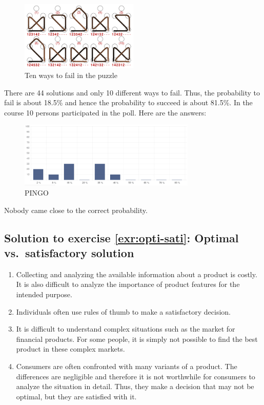 \documentclass[
  12pt,
  oneside]{book}
\providecommand{\tightlist}{%
  \setlength{\itemsep}{0pt}\setlength{\parskip}{0pt}}
\theoremstyle{definition}
\theoremstyle{definition}
\theoremstyle{definition}
\theoremstyle{definition}
\theoremstyle{remark}
\begin{document}
\begin{figure}
\centering
\includegraphics[width=0.5\textwidth,height=\textheight]{fig/nikolaus3.png}
\caption[\label{fig:nikolaus3} Ten ways to fail in the puzzle]{\label{fig:nikolaus3} Ten ways to fail in the puzzle\footnotemark{}}
\end{figure}

There are 44 solutions and only 10 different ways to fail. Thus, the probability to fail is about 18.5\% and hence the probability to succeed is about 81.5\%. In the course 10 persons participated in the poll. Here are the answers:

\begin{figure}
\centering
\includegraphics[width=0.75\textwidth,height=\textheight]{fig/nikolaus-poll.png}
\caption{\label{fig:nikolaus-poll} PINGO}
\end{figure}

Nobody came close to the correct probability.

\hypertarget{sol:opti-sati}{%
\subsection*{Solution to exercise \ref{exr:opti-sati}: Optimal vs.~satisfactory solution}\label{sol:opti-sati}}

\begin{enumerate}
\def\labelenumi{\Alph{enumi})}
\tightlist
\item
  Collecting and analyzing the available information about a product is costly. It is also difficult to analyze the importance of product features for the intended purpose.
\item
  Individuals often use rules of thumb to make a satisfactory decision.
\item
  It is difficult to understand complex situations such as the market for financial products. For some people, it is simply not possible to find the best product in these complex markets.
\item
  Consumers are often confronted with many variants of a product. The differences are negligible and therefore it is not worthwhile for consumers to analyze the situation in detail. Thus, they make a decision that may not be optimal, but they are satisfied with it.
\end{enumerate}
\end{document}
